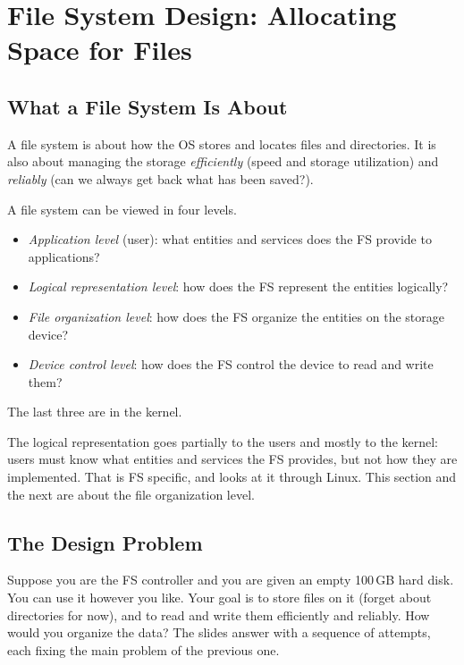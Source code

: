 \section{File System Design: Allocating Space for Files}
\label{sec:alloc}

\subsection{What a File System Is About}

A file system is about how the OS stores and locates files and directories. It is also about managing the storage \emph{efficiently} (speed and storage utilization) and \emph{reliably} (can we always get back what has been saved?).

\begin{definition}
  A file system can be viewed in four levels.
  \begin{itemize}
    \item \emph{Application level} (user): what entities and services does the FS provide to applications?
    \item \emph{Logical representation level}: how does the FS represent the entities logically?
    \item \emph{File organization level}: how does the FS organize the entities on the storage device?
    \item \emph{Device control level}: how does the FS control the device to read and write them?
  \end{itemize}
  The last three are in the kernel.
\end{definition}

The logical representation goes partially to the users and mostly to the kernel: users must know what entities and services the FS provides, but not how they are implemented. That is FS specific, and  looks at it through Linux. This section and the next are about the file organization level.

\subsection{The Design Problem}

Suppose you are the FS controller and you are given an empty 100\,GB hard disk. You can use it however you like. Your goal is to store files on it (forget about directories for now), and to read and write them efficiently and reliably. How would you organize the data? The slides answer with a sequence of attempts, each fixing the main problem of the previous one.

